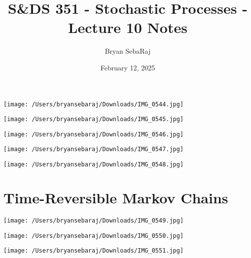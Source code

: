 \documentclass{article}
\title{S\&DS 351 - Stochastic Processes - Lecture 10 Notes}
\author{Bryan SebaRaj}
\date{February 12, 2025}
\begin{document}
\maketitle


\texttt{[image: /Users/bryansebaraj/Downloads/IMG\_0544.jpg]}

\texttt{[image: /Users/bryansebaraj/Downloads/IMG\_0545.jpg]}

\texttt{[image: /Users/bryansebaraj/Downloads/IMG\_0546.jpg]}


\texttt{[image: /Users/bryansebaraj/Downloads/IMG\_0547.jpg]}


\texttt{[image: /Users/bryansebaraj/Downloads/IMG\_0548.jpg]}

\section*{Time-Reversible Markov Chains}

\texttt{[image: /Users/bryansebaraj/Downloads/IMG\_0549.jpg]}


\texttt{[image: /Users/bryansebaraj/Downloads/IMG\_0550.jpg]}


\texttt{[image: /Users/bryansebaraj/Downloads/IMG\_0551.jpg]}
\end{document}
